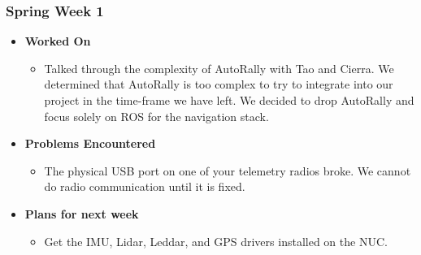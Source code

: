 \documentclass[compsoc,draftclsnofoot,onecolumn,10pt]{IEEEtran}
\begin{document}
\subsubsection{Spring Week 1}
\begin{itemize}
    \item {\textbf{Worked On}}
    \begin{itemize}
        \item Talked through the complexity of AutoRally with Tao and Cierra. We determined that AutoRally is too complex to try to integrate into our project in the time-frame we have left. We decided to drop AutoRally and focus solely on ROS for the navigation stack.
    \end{itemize}

    \item {\textbf{Problems Encountered}}
    \begin{itemize}
        \item The physical USB port on one of your telemetry radios broke. We cannot do radio communication until it is fixed.
    \end{itemize}

    \item{\textbf{Plans for next week}}
    \begin{itemize}
        \item Get the IMU, Lidar, Leddar, and GPS drivers installed on the NUC.
    \end{itemize}
\end{itemize}
\end{document}
